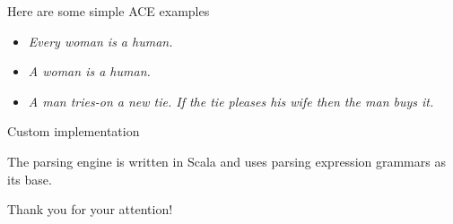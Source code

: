 \documentclass{beamer}
\begin{document}
\begin{frame}
Here are some simple ACE examples
\begin{itemize}
\item \textit{Every woman is a human.}
\item \textit{A woman is a human.}
\item \textit{A man tries-on a new tie. If the tie pleases his wife then the man buys it.}
\end{itemize}
\end{frame}

\begin{frame}{Custom implementation}
\end{frame}

\begin{frame}
The parsing engine is written in Scala and uses parsing expression grammars as its base.
\end{frame}

\begin{frame}
\begin{center}
\huge Thank you for your attention!
\end{center}

\end{frame}
\end{document}
